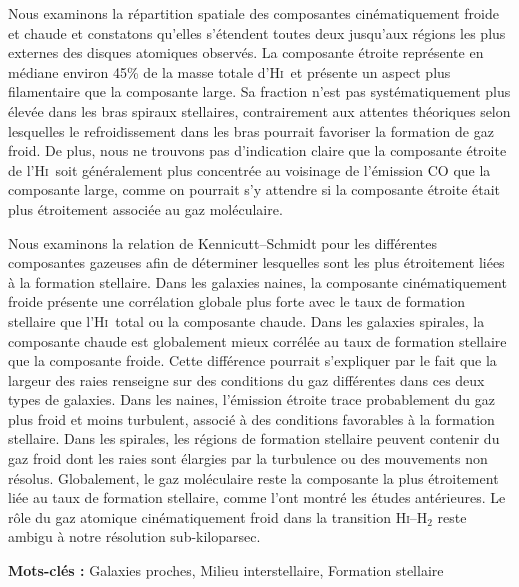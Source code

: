 \documentclass[12pt]{article}
\newcommand{\HI}{\textrm{H\textsc{i}}}
\begin{document}
Nous examinons la répartition spatiale des composantes cinématiquement froide et chaude et constatons qu'elles s'étendent toutes deux jusqu'aux régions les plus externes des disques atomiques observés. La composante étroite représente en médiane environ 45\% de la masse totale d'\HI\ et présente un aspect plus filamentaire que la composante large. Sa fraction n'est pas systématiquement plus élevée dans les bras spiraux stellaires, contrairement aux attentes théoriques selon lesquelles le refroidissement dans les bras pourrait favoriser la formation de gaz froid. De plus, nous ne trouvons pas d'indication claire que la composante étroite de l'\HI\ soit généralement plus concentrée au voisinage de l'émission CO que la composante large, comme on pourrait s'y attendre si la composante étroite était plus étroitement associée au gaz moléculaire.

Nous examinons la relation de Kennicutt--Schmidt pour les différentes composantes gazeuses afin de déterminer lesquelles sont les plus étroitement liées à la formation stellaire. Dans les galaxies naines, la composante cinématiquement froide présente une corrélation globale plus forte avec le taux de formation stellaire que l'\HI\ total ou la composante chaude. Dans les galaxies spirales, la composante chaude est globalement mieux corrélée au taux de formation stellaire que la composante froide. Cette différence pourrait s'expliquer par le fait que la largeur des raies renseigne sur des conditions du gaz différentes dans ces deux types de galaxies. Dans les naines, l'émission étroite trace probablement du gaz plus froid et moins turbulent, associé à des conditions favorables à la formation stellaire. Dans les spirales, les régions de formation stellaire peuvent contenir du gaz froid dont les raies sont élargies par la turbulence ou des mouvements non résolus. Globalement, le gaz moléculaire reste la composante la plus étroitement liée au taux de formation stellaire, comme l'ont montré les études antérieures. Le rôle du gaz atomique cinématiquement froid dans la transition \HI--H$_2$ reste ambigu à notre résolution sub-kiloparsec.

\vspace{2em}
\noindent\textbf{Mots-clés :} Galaxies proches, Milieu interstellaire, Formation stellaire

\end{document}
